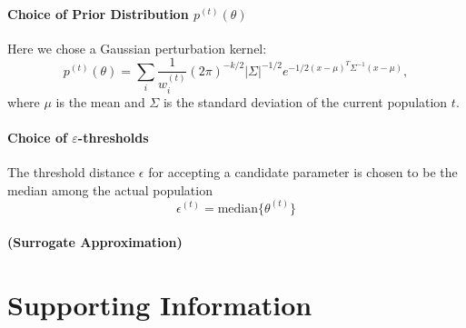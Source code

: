 \documentclass[10pt,letterpaper]{article}
\begin{document}
\paragraph{Choice of Prior Distribution $p^{(t)}(\theta)$}
Here we chose a Gaussian perturbation kernel:
\begin{equation}
	p^{(t)}(\theta) = \sum_{i}\frac{1}{w^{(t)}_{i}} (2\pi)^{-k/2} |\Sigma|^{-1/2}e^{-1/2(x-\mu)^{T}\Sigma^{-1}(x-\mu)},
\end{equation}
where $\mu$ is the mean and $\Sigma$ is the standard deviation of the current population $t$.
\paragraph{Choice of $\varepsilon$-thresholds} The threshold distance $\epsilon$ for accepting a candidate parameter is chosen to be the median among the actual population 
\begin{equation}
	\epsilon^{(t)} = \text{median} \{ \theta^{(t)} \}
\end{equation}


\paragraph{(Surrogate Approximation)}





\section*{Supporting Information}
\end{document}
